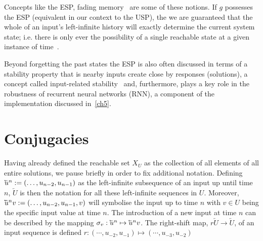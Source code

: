 Concepts like the ESP,  fading memory~\cite{boyd1985fading} are some of these notions.  
If $g$ possesses the ESP (equivalent in our context to the USP), the we are guaranteed that the whole of an input's left-infinite history will exactly determine the current system state; i.e. there is only ever the possibility of a single reachable state at a given instance of time~\cite{jaeger2001echo,Manju_2020}.

Beyond forgetting the past states the ESP is also often discussed in terms of a stability property that is nearby inputs create close by responses (solutions), a concept called input-related stability~\cite{manjunath2020stability} and, furthermore, plays a key role in the robustness of recurrent neural networks (RNN), a component of the implementation discussed in~\ref{ch5}.

\section{Conjugacies}

Having already defined the reachable set $X_U$ as the collection of all elements of all entire solutions, we pause briefly in order to fix additional notation.
Defining $\cev{u}^{n}:=(\ldots,u_{n-2} ,u_{n-1})$ as the left-infinite subsequence of an input up until time $n$, $\overleftarrow{U}$ is then the notation for all these left-infinite sequences in $U$. 
Moreover, $\cev{u}^{n}v:=(\ldots,u_{n-2} ,u_{n-1}, v)$ will symbolise the input up to time $n$ with $v \in U$ being the specific input value at time $n$. 
The introduction of a new input at time $n$ can be described by the mapping $\sigma_v:   \cev{u}^{n} \mapsto \cev{u}^{n}v$. 
The right-shift map, $r\overleftarrow{U}\to\overleftarrow{U}$, of an input sequence is defined $r: (\cdots, u_{-2},u_{-1}) \mapsto(\cdots, u_{-3},u_{-2})$

